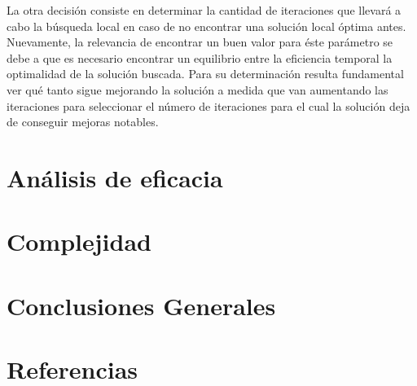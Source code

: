 \documentclass[a4paper,11pt] {article}
\begin{document}
La otra decisión consiste en determinar la cantidad de iteraciones que llevará a cabo la búsqueda local en caso de no encontrar una solución local óptima antes. Nuevamente, la relevancia de encontrar un buen valor para éste parámetro se debe a que es necesario encontrar un equilibrio entre la eficiencia temporal la optimalidad de la solución buscada. Para su determinación resulta fundamental ver qué tanto sigue mejorando la solución a medida que van aumentando las iteraciones para seleccionar el número de iteraciones para el cual la solución deja de conseguir mejoras notables.

\section*{An\'alisis de eficacia}

\section*{Complejidad}

\section{Conclusiones Generales}

\section*{Referencias}
\end{document}
